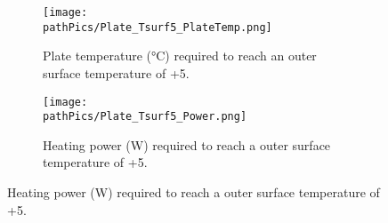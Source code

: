 \begin{figure}[ht]
\centering
\begin{minipage}[b]{0.48\linewidth}
\begin{figure} [H]
	\centering
	\texttt{[image: \\pathPics/Plate\_Tsurf5\_PlateTemp.png]}
	\caption[Heating Plate - Plate Temperature Graph]{Plate temperature (°C) required to reach an outer surface temperature of +5\dC.}
	\label{fig:PlateTemp}
\end{figure}

\end{minipage}
\quad
\begin{minipage}[b]{0.48\linewidth}
\begin{figure} [H]
	\centering
	\texttt{[image: \\pathPics/Plate\_Tsurf5\_Power.png]}
	\caption[Heating Plate - Heating Power Graph]{Heating power (W) required to reach a outer surface temperature of +5\dC.}
	\label{fig:PlatePower}
\end{figure}
\end{minipage}
\end{figure}




